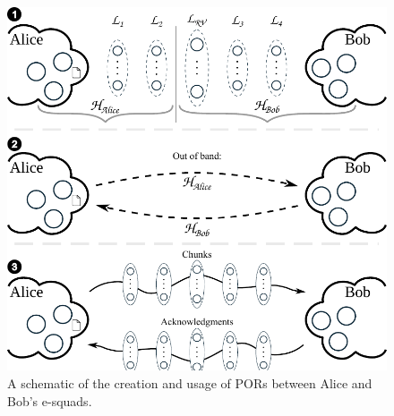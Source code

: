\begin{figure}[t]
\center
  \includegraphics[scale=.55]{figures/file_exchange_v2.pdf}
  \caption{\label{fig:file-exchange}A schematic of the creation and usage of PORs between Alice and Bob's e-squads.}
\end{figure}





